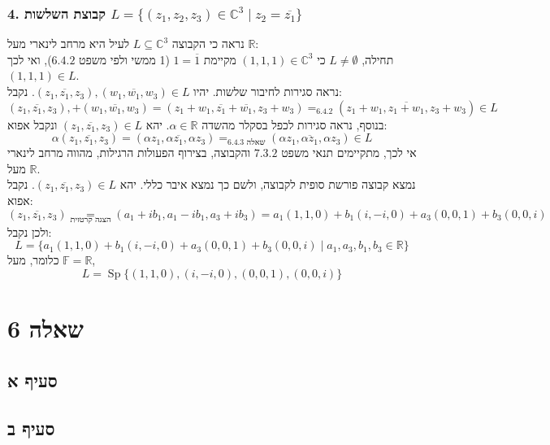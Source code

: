 \documentclass{article}
\newcommand\underrel[2]{\mathrel{\mathop{#2}\limits_{#1}}}
\DeclareMathOperator*{\equals}{=}
\DeclareMathOperator\Sp{Sp}
\begin{document}
\subsubsection*{4. קבוצת השלשות $
        L = \{(z_1,z_2,z_3)\in \mathbb{C}^3 \; | \; z_2 = \overline{z_1}\}
    $}
נראה כי הקבוצה $L\subseteq \mathbb{C}^3$ לעיל היא מרחב לינארי מעל $\mathbb{R}$: \\
תחילה, $L\ne \emptyset$
כי $(1,1,1)\in \mathbb{C}^3$ מקיימת $1=\overline{1}$ (1 ממשי ולפי משפט $6.4.2$),
ואי לכך $(1,1,1)\in L$. \\
נראה סגירות לחיבור שלשות. יהיו $(z_1,\overline{z_1}, z_3), (w_1, \overline{w_1}, w_3)\in L$. נקבל:
\[
    (z_1,\overline{z_1}, z_3),+ (w_1, \overline{w_1}, w_3) =
    (z_1+w_1, \overline{z_1}+\overline{w_1}, z_3+w_3) \equals_{6.4.2}
    (z_1+w_1, \overline{z_1+w_1}, z_3+w_3)\in L
\]
בנוסף, נראה סגירות לכפל בסקלר מהשדה $\alpha \in \mathbb{R}$. יהא $(z_1, \overline{z_1}, z_3)\in L$ ונקבל אפוא:
\[
    \alpha (z_1, \overline{z_1}, z_3) =
    (\alpha z_1, \alpha \overline{z_1}, \alpha z_3) \equals_{\text{שאלה 6.4.3} }
    (\alpha z_1, \overline{\alpha z_1}, \alpha z_3) \in L
\]
אי לכך, מתקיימים תנאי משפט $7.3.2$ והקבוצה, בצירוף הפעולות הרגילות, מהווה מרחב לינארי מעל $\mathbb{R}$. \\
נמצא קבוצה פורשת סופית לקבוצה, ולשם כך נמצא איבר כללי. יהא $(z_1, \overline{z_1}, z_3)\in L$. נקבל אפוא:
\[
    (z_1, \overline{z_1}, z_3) \underrel{\text{הצגה קרטזית}}{=}
    (a_1+ib_1, a_1-ib_1, a_3+ib_3) =
    a_1(1,1,0)+b_1(i,-i, 0)+a_3(0,0,1)+b_3(0,0,i)
\]
ולכן נקבל:
\[
    L=\{a_1(1,1,0)+b_1(i,-i, 0)+a_3(0,0,1)+b_3(0,0,i) \; | \; a_1, a_3, b_1, b_3 \in \mathbb{R} \}
\]
כלומר, מעל $\mathbb{F}=\mathbb{R}$,
\[
    L=\Sp\{(1,1,0),(i,-i, 0),(0,0,1),(0,0,i) \}
\]

\pagebreak

\section*{שאלה 6}

\subsection*{סעיף א}

\subsection*{סעיף ב}
\end{document}
